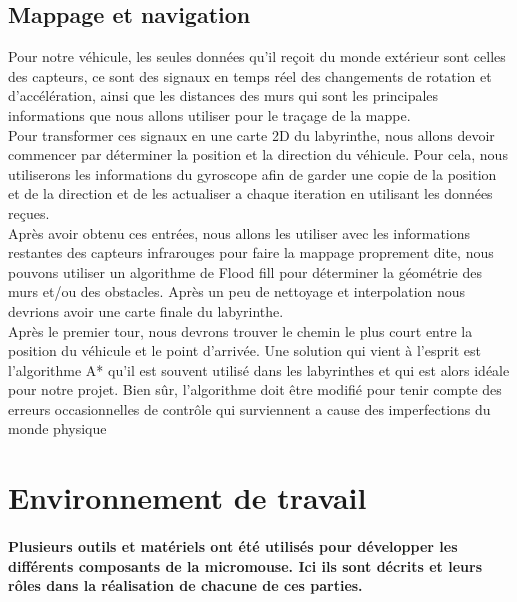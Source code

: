 \subsection{Mappage et navigation} \label{subsec:rechChem} 

   Pour notre véhicule, les seules données qu'il reçoit du monde extérieur sont
celles des capteurs, ce sont des signaux en temps réel des changements de
rotation et d'accélération, ainsi que les distances des murs qui sont les
principales informations que nous allons utiliser pour le traçage de la mappe. \\

   Pour transformer ces signaux en une carte 2D du labyrinthe, nous allons devoir
commencer par déterminer la position et la direction du véhicule. Pour cela,
nous utiliserons les informations du gyroscope afin de garder une copie de la
position et de la direction et de les actualiser a chaque iteration en
utilisant les données reçues. \\

   Après avoir obtenu ces entrées, nous allons les utiliser avec les informations
restantes des capteurs infrarouges pour faire la mappage proprement dite, nous
pouvons utiliser un algorithme de Flood fill pour déterminer la géométrie des
murs et/ou des obstacles. Après un peu de nettoyage et interpolation nous
devrions avoir une carte finale du labyrinthe. \\

   Après le premier tour, nous devrons trouver le chemin le plus court entre la
position du véhicule et le point d'arrivée. Une solution qui vient à l'esprit
est l'algorithme A* qu'il est souvent utilisé dans les labyrinthes et qui est
alors idéale pour notre projet. Bien sûr, l'algorithme doit être modifié pour
tenir compte des erreurs occasionnelles de contrôle qui surviennent a cause des
imperfections du monde physique

\section{Environnement de travail} \label{sec:environnement}

\paragraph{ 
   Plusieurs outils et matériels ont été utilisés pour développer les
différents composants de la micromouse. Ici ils sont décrits et leurs rôles
dans la réalisation de chacune de ces parties.}

